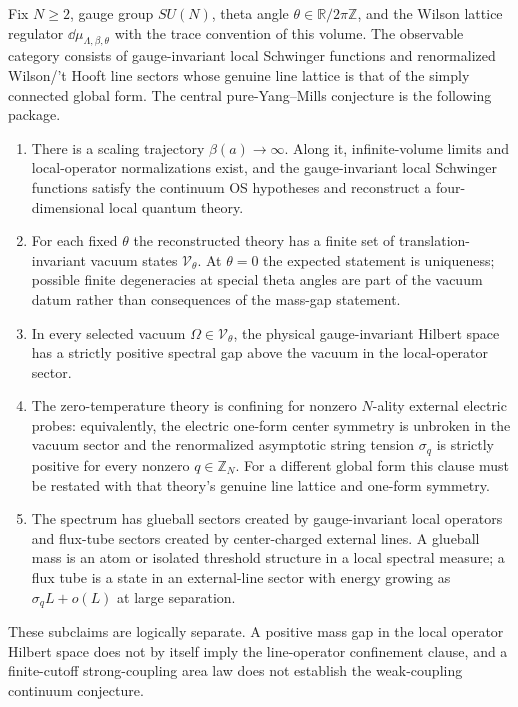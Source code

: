 \begin{conjecture}
\label{conj:pure-yang-mills-central}
Fix \(N\ge2\), gauge group \(SU(N)\), theta angle
\(\theta\in\mathbb R/2\pi\mathbb Z\), and the Wilson lattice regulator
\(\dd\mu_{\Lambda,\beta,\theta}\) with the trace convention of this volume.
The observable category consists of gauge-invariant local Schwinger functions
and renormalized Wilson/'t Hooft line sectors whose genuine line lattice is that
of the simply connected global form.  The central pure-Yang--Mills conjecture
is the following package.
\begin{enumerate}[label=(\roman*)]
\item There is a scaling trajectory \(\beta(a)\to\infty\).  Along it,
  infinite-volume limits and local-operator normalizations exist, and the
  gauge-invariant local Schwinger functions satisfy the continuum OS
  hypotheses and reconstruct a four-dimensional local quantum theory.
\item For each fixed \(\theta\) the reconstructed theory has a finite set of
  translation-invariant vacuum states \(\mathcal V_\theta\).  At
  \(\theta=0\) the expected statement is uniqueness; possible finite
  degeneracies at special theta angles are part of the vacuum datum rather than
  consequences of the mass-gap statement.
\item In every selected vacuum \(\Omega\in\mathcal V_\theta\), the physical
  gauge-invariant Hilbert space has a strictly positive spectral gap above the
  vacuum in the local-operator sector.
\item The zero-temperature theory is confining for nonzero \(N\)-ality
  external electric probes: equivalently, the electric one-form center symmetry
  is unbroken in the vacuum sector and the renormalized asymptotic string
  tension \(\sigma_q\) is strictly positive for every nonzero
  \(q\in\mathbb Z_N\).  For a different global form this clause must be
  restated with that theory's genuine line lattice and one-form symmetry.
\item The spectrum has glueball sectors created by gauge-invariant local
  operators and flux-tube sectors created by center-charged external lines.
  A glueball mass is an atom or isolated threshold structure in a local
  spectral measure; a flux tube is a state in an external-line sector with
  energy growing as \(\sigma_q L+o(L)\) at large separation.
\end{enumerate}
These subclaims are logically separate.  A positive mass gap in the local
operator Hilbert space does not by itself imply the line-operator confinement
clause, and a finite-cutoff strong-coupling area law does not establish the
weak-coupling continuum conjecture.
\end{conjecture}

